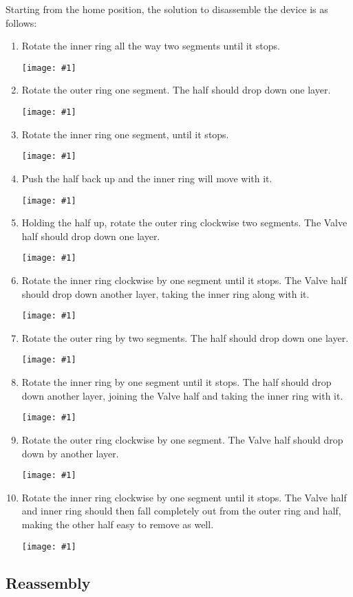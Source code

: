 \documentclass{article}
\newcommand{\diagram}[1]{
      \begin{center}
            \texttt{[image: \#1]}
      \end{center}
}
\begin{document}
Starting from the home position, the solution to disassemble the device is as follows:
\begin{enumerate}
      \item Rotate the inner ring all the way \cc{} two segments until it stops.
            \diagram{apart-01}
      \item Rotate the outer ring \cc{} one segment.
            The \han{} half should drop down one layer.
            \diagram{apart-02}
      \item Rotate the inner ring \cc{} one segment, until it stops.
            \diagram{apart-03}
      \item Push the \han{} half back up and the inner ring will move with it.
            \diagram{apart-04}
      \item Holding the \han{} half up, rotate the outer ring clockwise two segments.
            The Valve half should drop down one layer.
            \diagram{apart-05}
      \item Rotate the inner ring clockwise by one segment until it stops.
            The Valve half should drop down another layer, taking the inner ring along with it.
            \diagram{apart-06}
      \item Rotate the outer ring \cc{} by two segments.
            The \han{} half should drop down one layer.
            \diagram{apart-07}
      \item Rotate the inner ring \cc{} by one segment until it stops.
            The \han{} half should drop down another layer, joining the Valve half and taking the inner ring with it.
            \diagram{apart-08}
      \item Rotate the outer ring clockwise by one segment.
            The Valve half should drop down by another layer.
            \diagram{apart-09}
      \item Rotate the inner ring clockwise by one segment until it stops.
            The Valve half and inner ring should then fall completely out from the outer ring and \han{} half, making the other half easy to remove as well.
            \diagram{apart-10}
\end{enumerate}

\subsection{Reassembly}
\end{document}
